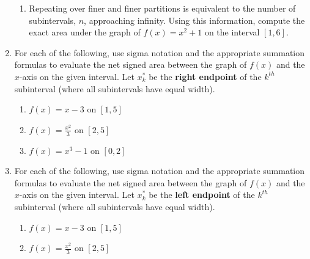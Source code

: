 \documentclass[12pt]{article}
\newif\ifans
\begin{document}
\begin{enumerate}
\begin{enumerate}
\item Repeating over finer and finer partitions is equivalent to the number of subintervals, $n$, approaching infinity.  Using this information, compute the exact area under the graph of $f(x)=x^2+1$ on the interval $[1,6]$.

\ifans{\fbox{$\frac{230}{3}$}}\fi

\end{enumerate}

\item For each of the following, use sigma notation and the appropriate summation formulas to evaluate the net signed area between the graph of $f(x)$ and the $x$-axis on the given interval.  Let $x_k^*$ be the {\bf right endpoint} of the $k^{th}$ subinterval (where all subintervals have equal width).

\begin{enumerate}

\item $f(x)=x-3$ on $[1,5]$

\ifans{\fbox{0; Detailed Solution: \textcolor{blue}{\href{http://www.math.drexel.edu/classes/Calculus/resources/Math122HW/Solutions/122_01_Area_Limit_19a.pdf}{Here}}}} \fi

\item $f(x)=\frac{x^2}{3}$ on $[2,5]$

\ifans{\fbox{13; Detailed Solution: \textcolor{blue}{\href{http://www.math.drexel.edu/classes/Calculus/resources/Math122HW/Solutions/122_01_Area_Limit_19b.pdf}{Here}}}} \fi

\item $f(x)=x^3-1$ on $[0,2]$

\ifans{\fbox{2}} \fi

\end{enumerate}

\item For each of the following, use sigma notation and the appropriate summation formulas to evaluate the net signed area between the graph of $f(x)$ and the $x$-axis on the given interval.  Let $x_k^*$ be the {\bf left endpoint} of the $k^{th}$ subinterval (where all subintervals have equal width).

\begin{enumerate}

\item $f(x)=x-3$ on $[1,5]$

\ifans{\fbox{0}} \fi

\item $f(x)=\frac{x^2}{3}$ on $[2,5]$


\end{enumerate}
\end{enumerate}
\end{document}
